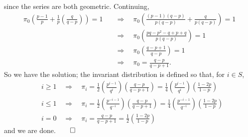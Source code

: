 \documentclass[11pt, letterpaper]{article}
\begin{document}
    since the series are both geometric. Continuing,
    \begin{align*}
        \pi_0\left(\frac{p-1}{p}+\frac{1}{p}\left(\frac{q}{q-p}\right)\right)=1\quad&\Rightarrow\quad\pi_0\left(\frac{(p-1)(q-p)}{p(q-p)}+\frac{q}{p(q-p)}\right)=1\\
        &\Rightarrow\quad\pi_0\left(\frac{pq-p^2-q+p+q}{p(q-p)}\right)=1\\
        &\Rightarrow\quad\pi_0\left(\frac{q-p+1}{q-p}\right)=1\\
        &\Rightarrow\quad\pi_0=\frac{q-p}{q-p+1}.
    \end{align*}
    So we have the solution; the invariant distribution is defined so that, for $i\in S$,
    \begin{align*}
        &i\geq 1\quad\Rightarrow\quad \pi_i=\frac{1}{2}\left(\frac{p^{i-1}}{q^i}\right)\left(\frac{q-p}{q-p+1}\right)=\frac{1}{4}\left(\frac{p^{i-1}}{q^i}\right)\left(\frac{1-2p}{1-p}\right)\\
        &i\leq 1\quad\Rightarrow\quad \pi_i=\frac{1}{2}\left(\frac{p^{-i-1}}{q^{-i}}\right)\left(\frac{q-p}{q-p+1}\right)=\frac{1}{4}\left(\frac{p^{-i-1}}{q^{-i}}\right)\left(\frac{1-2p}{1-p}\right)\\
        &i=0\quad\Rightarrow\quad\pi_i=\frac{q-p}{q-p+1}=\frac{1}{2}\left(\frac{1-2p}{1-p}\right)
    \end{align*}
    and we are done.\hfill{$\qed$}
\end{document}
